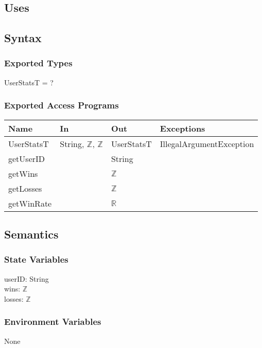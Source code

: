\documentclass[12pt, titlepage]{article}
\begin{document}
\subsection{Uses}

\subsection{Syntax}
\subsubsection{Exported Types}
UserStatsT = ?

\subsubsection{Exported Access Programs}

\begin{center}
\begin{tabular}{ |  p{4cm} | p{3cm} |  p{3cm} | p{5cm} | }
\hline
\textbf{Name} & \textbf{In} & \textbf{Out} & \textbf{Exceptions} \\
\hline
UserStatsT & String, $\mathbb{Z}$, $\mathbb{Z}$ & UserStatsT & IllegalArgumentException \\
getUserID & & String & \\
getWins & & $\mathbb{Z}$  & \\
getLosses & & $\mathbb{Z}$ & \\
getWinRate & & $\mathbb{R}$ & \\

\hline
\end{tabular}
\end{center}

\subsection{Semantics}

\subsubsection{State Variables}

userID: String \\
wins: $\mathbb{Z}$ \\
losses:  $\mathbb{Z}$

\subsubsection{Environment Variables}
None
\end{document}
